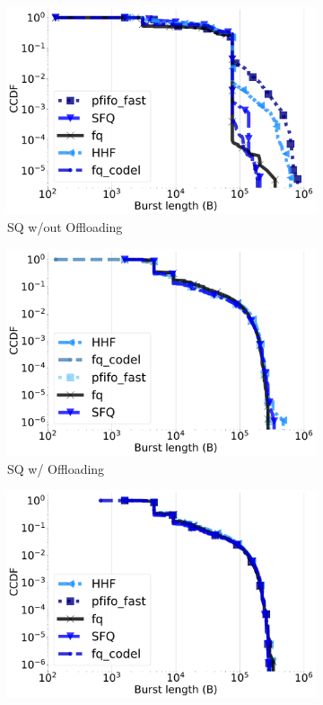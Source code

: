 \begin{figure}[t]
\centering
\begin{subfigure}[t]{0.32\linewidth}
    \centering
    	\includegraphics[width=1\linewidth]{figs/26_4.pdf}
    \caption{SQ w/out Offloading}
	\label{fig:qdisc}
\end{subfigure}
\begin{subfigure}[t]{0.32\linewidth}
    \centering
    	\includegraphics[width=1\linewidth]{figs/26_6_fig.pdf}
    \caption{SQ w/ Offloading}
	\label{fig:qdisc_tso}
\end{subfigure}
\begin{subfigure}[t]{0.32\linewidth}
    \centering
    	\includegraphics[width=1\linewidth]{figs/26_2.pdf}

\end{subfigure}
\end{figure}
